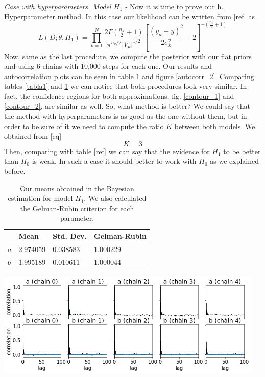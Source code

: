 \documentclass[onecolumn,           %
               showpacs,            %
               preprintnumbers,     %
               aps,                 %
               letterpaper,             %
               superscriptaddress,      %
               nofootinbib,         %
               tightenlines,        %
               floats,floatfix      %
               ,usenatbib,
               ]{revtex4-1}
\begin{document}
\textit{Case with hyperparameters. Model $H_1$.-} Now it is time to prove our h. Hyperparameter method. In this case our likelihood can be written from [ref] as
\begin{equation}
L(D;\theta,H_1)=\prod_{k=1}^N\frac{2\Gamma(\frac{n_k}{2}+1)}{\pi^{n_k/2}|V_k|^{1/2}}\left[\frac{(y_d-y)^2}{2\sigma_k^2}+2\right]^{-\left(\frac{n_k}{2}+1\right)}
\end{equation}
Now, same as the last procedure, we compute the posterior with our flat priors and using 6 chains with 10,000 steps for each one. Our results and autocorrelation plots can be seen in table \ref{tab} and figure \ref{autocorr_2}. Comparing tables \ref{tabla1} and \ref{tab} we can notice that both procedures look very similar. In fact, the confidence regions for both approximations, fig. \ref{contour_1} and \ref{contour_2}, are similar as well. So, what method is better? We could say that the method with hyperparameters is as good as the one without them, but in order to be sure of it we need to compute the ratio $K$ between both models. We obtained from [eq] 
\begin{equation}
K = 3
\end{equation}
Then, comparing with table [ref] we can say that the evidence for $H_1$ to be better than $H_0$ is weak. In such a case it should better to work with $H_0$ as we explained before.

\begin{table}[h!]
\centering
\begin{tabular}{||l|l|l|l||} 
 \hline
 & \textbf{Mean} & \textbf{Std. Dev.} & \textbf{Gelman-Rubin} \\ [0.5ex] 
 \hline\hline
$a$ & 2.974059 	 & 0.038583 & 1.000229 \\
\hline
$b$ & 1.995189 & 0.010611 	 & 1.000044\\ [1ex] 
 \hline
\end{tabular}
\caption{\footnotesize{Our means obtained in the Bayesian estimation for model $H_1$. We also calculated the Gelman-Rubin criterion for each parameter.}}
\label{tab}
\end{table}

\begin{minipage}{\textwidth}
\centering
\includegraphics[height=5cm]{Figures/autocorr_2.png}
\label{autocorr_2}
\end{minipage}
\\$ $
\end{document}
